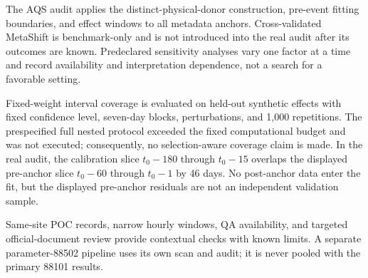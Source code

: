 The AQS audit applies the distinct-physical-donor construction, pre-event
fitting boundaries, and effect windows to all \TotalAnchors{} metadata anchors.
Cross-validated MetaShift is benchmark-only and is not introduced into the
real audit after its outcomes are known. Predeclared sensitivity analyses vary
one factor at a time and record availability and interpretation dependence,
not a search for a favorable setting.

Fixed-weight interval coverage is evaluated on held-out synthetic effects with
fixed confidence level, seven-day blocks, perturbations, and 1,000
repetitions. The prespecified full nested protocol exceeded the fixed
computational budget and was not executed; consequently, no selection-aware
coverage claim is made. In the real audit, the calibration slice
$t_0-180$ through $t_0-15$ overlaps the displayed pre-anchor slice
$t_0-60$ through $t_0-1$ by 46 days. No post-anchor data enter the fit, but
the displayed pre-anchor residuals are not an independent validation sample.

Same-site POC records, narrow hourly windows, QA availability, and targeted
official-document review provide contextual checks with known limits. A
separate parameter-88502 pipeline uses its own scan and audit; it is never
pooled with the primary 88101 results.
